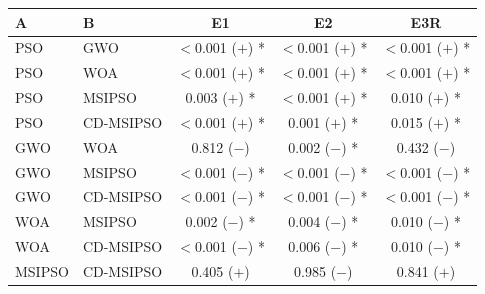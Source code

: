 \begin{tabular}{llccc}
\hline
A & B & E1 & E2 & E3R \\
\hline
PSO & GWO & $<$0.001 ($+$) * & $<$0.001 ($+$) * & $<$0.001 ($+$) * \\
PSO & WOA & $<$0.001 ($+$) * & $<$0.001 ($+$) * & $<$0.001 ($+$) * \\
PSO & MSIPSO & 0.003 ($+$) * & $<$0.001 ($+$) * & 0.010 ($+$) * \\
PSO & CD-MSIPSO & $<$0.001 ($+$) * & 0.001 ($+$) * & 0.015 ($+$) * \\
GWO & WOA & 0.812 ($-$)  & 0.002 ($-$) * & 0.432 ($-$)  \\
GWO & MSIPSO & $<$0.001 ($-$) * & $<$0.001 ($-$) * & $<$0.001 ($-$) * \\
GWO & CD-MSIPSO & $<$0.001 ($-$) * & $<$0.001 ($-$) * & $<$0.001 ($-$) * \\
WOA & MSIPSO & 0.002 ($-$) * & 0.004 ($-$) * & 0.010 ($-$) * \\
WOA & CD-MSIPSO & $<$0.001 ($-$) * & 0.006 ($-$) * & 0.010 ($-$) * \\
MSIPSO & CD-MSIPSO & 0.405 ($+$)  & 0.985 ($-$)  & 0.841 ($+$)  \\
\hline
\end{tabular}